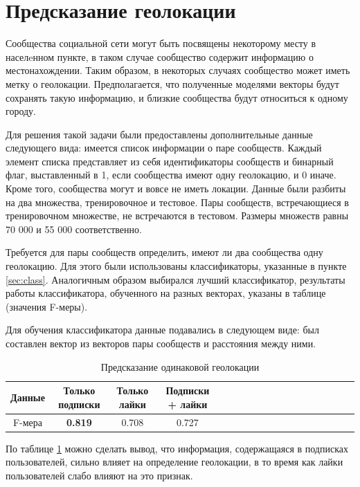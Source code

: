\documentclass[times,specification,annotation]{itmo-student-thesis}
\begin{document}
\section{Предсказание геолокации} \label{sec:geo}

Сообщества социальной сети могут быть посвящены некоторому месту в населeнном пункте, в таком случае сообщество содержит информацию о местонахождении. Таким образом, в некоторых случаях сообщество может иметь метку о геолокации. Предполагается, что полученные моделями векторы будут сохранять такую информацию, и близкие сообщества будут относиться к одному городу. 

Для решения такой задачи были предоставлены дополнительные данные следующего вида: имеется список информации о паре сообществ. Каждый элемент списка представляет из себя идентификаторы сообществ и бинарный флаг, выставленный в 1, если сообщества имеют одну геолокацию, и 0 иначе. Кроме того, сообщества могут и вовсе не иметь локации. Данные были разбиты на два множества, тренировочное и тестовое. Пары сообществ, встречающиеся в тренировочном множестве, не встречаются в тестовом. Размеры множеств равны 70 000 и 55 000 соответственно.

Требуется для пары сообществ определить, имеют ли два сообщества одну геолокацию. Для этого были использованы классификаторы, указанные в пункте \ref{sec:class}. Аналогичным образом выбирался лучший классификатор, результаты работы классификатора, обученного на разных векторах, указаны в таблице (значения F-меры). 

Для обучения классификатора данные подавались в следующем виде: был составлен вектор из векторов пары сообществ и расстояния между ними. 

\begin{table}[!h]
\caption{Предсказание одинаковой геолокации} \label{tab2-geo-cmp}
\centering
\begin{tabular}{|*{18}{c|}}\hline
Данные  & Только подписки  & Только лайки & Подписки + лайки \\\hline
F-мера                        & \textbf{0.819} & 0.708  & 0.727 \\\hline
\end{tabular}
\end{table}

По таблице \ref {tab2-geo-cmp} можно сделать вывод, что информация, содержащаяся в подписках пользователей, сильно влияет на определение геолокации, в то время как лайки пользователей слабо влияют на это признак. 
\end{document}
